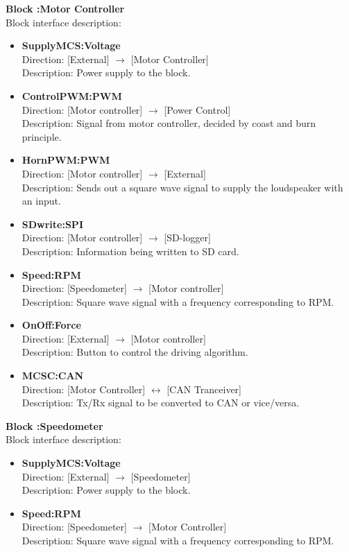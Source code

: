 \textbf{Block :Motor Controller}\\
Block interface description:
\begin{itemize}
	\item \textbf{SupplyMCS:Voltage}\\
	Direction: [External] $\rightarrow$ [Motor Controller]\\
	Description: Power supply to the block.
	\item \textbf{ControlPWM:PWM}\\
	Direction: [Motor controller] $\rightarrow$ [Power Control]\\
	Description: Signal from motor controller, decided by  coast and burn principle. 
	\item \textbf{HornPWM:PWM}\\
	Direction: [Motor controller] $\rightarrow$ [External]\\
	Description: Sends out a square wave signal to supply the loudspeaker with an input.
	\item \textbf{SDwrite:SPI}\\
	Direction: [Motor controller] $\rightarrow$ [SD-logger]\\
	Description: Information being written to SD card.
	\item \textbf{Speed:RPM}\\
	Direction: [Speedometer] $\rightarrow$ [Motor controller]\\
	Description: Square wave signal with a frequency corresponding to RPM.
	\item \textbf{OnOff:Force}\\
	Direction: [External] $\rightarrow$ [Motor controller]\\
	Description: Button to control the driving algorithm.
	\item \textbf{MCSC:CAN}\\
	Direction: [Motor Controller] $\leftrightarrow$ [CAN Tranceiver]\\
	Description: Tx/Rx signal to be converted to CAN or vice/versa.
\end{itemize}

\textbf{Block :Speedometer}\\
Block interface description:
\begin{itemize}
	\item \textbf{SupplyMCS:Voltage}\\
	Direction: [External] $\rightarrow$ [Speedometer]\\
	Description: Power supply to the block.
	\item \textbf{Speed:RPM}\\
	Direction: [Speedometer] $\rightarrow$ [Motor Controller]\\
	Description: Square wave signal with a frequency corresponding to RPM.
\end{itemize}


